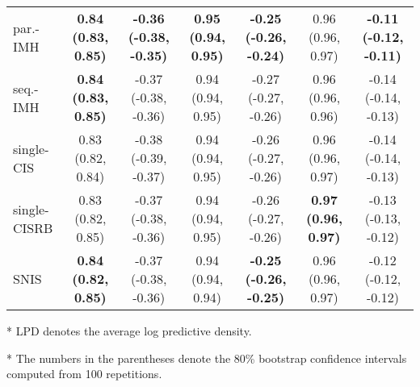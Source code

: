 \begin{table*}
\begin{threeparttable}
\begin{tabular}{lcccccc}
    par.-IMH & \textbf{0.84 {\scriptsize(0.83, 0.85)}} & \textbf{-0.36 {\scriptsize(-0.38, -0.35)}} & \textbf{0.95 {\scriptsize(0.94, 0.95)}} & \textbf{-0.25 {\scriptsize(-0.26, -0.24)}} & 0.96 {\scriptsize(0.96, 0.97)} & \textbf{-0.11 {\scriptsize(-0.12, -0.11)}} \\
    seq.-IMH & \textbf{0.84 {\scriptsize(0.83, 0.85)}} & -0.37 {\scriptsize(-0.38, -0.36)} & 0.94 {\scriptsize(0.94, 0.95)} & -0.27 {\scriptsize(-0.27, -0.26)} & 0.96 {\scriptsize(0.96, 0.96)} & -0.14 {\scriptsize(-0.14, -0.13)} \\
    single-CIS & 0.83 {\scriptsize(0.82, 0.84)} & -0.38 {\scriptsize(-0.39, -0.37)} & 0.94 {\scriptsize(0.94, 0.95)} & -0.26 {\scriptsize(-0.27, -0.26)} & 0.96 {\scriptsize(0.96, 0.97)} & -0.14 {\scriptsize(-0.14, -0.13)} \\
    single-CISRB & 0.83 {\scriptsize(0.82, 0.85)} & -0.37 {\scriptsize(-0.38, -0.36)} & 0.94 {\scriptsize(0.94, 0.95)} & -0.26 {\scriptsize(-0.27, -0.26)} & \textbf{0.97 {\scriptsize(0.96, 0.97)}} & -0.13 {\scriptsize(-0.13, -0.12)} \\
    SNIS & \textbf{0.84 {\scriptsize(0.82, 0.85)}} & -0.37 {\scriptsize(-0.38, -0.36)} & 0.94 {\scriptsize(0.94, 0.94)} & \textbf{-0.25 {\scriptsize(-0.26, -0.25)}} & 0.96 {\scriptsize(0.96, 0.97)} & -0.12 {\scriptsize(-0.12, -0.12)} \\\bottomrule
  \end{tabular}
  \begin{tablenotes}
    \item[*]{\footnotesize LPD denotes the average log predictive density.}
    \item[*]{\footnotesize The numbers in the parentheses denote the 80\% bootstrap confidence intervals computed from 100 repetitions.}
  \end{tablenotes}
  \end{threeparttable}
  \vspace{-0.15in}
\end{table*}

